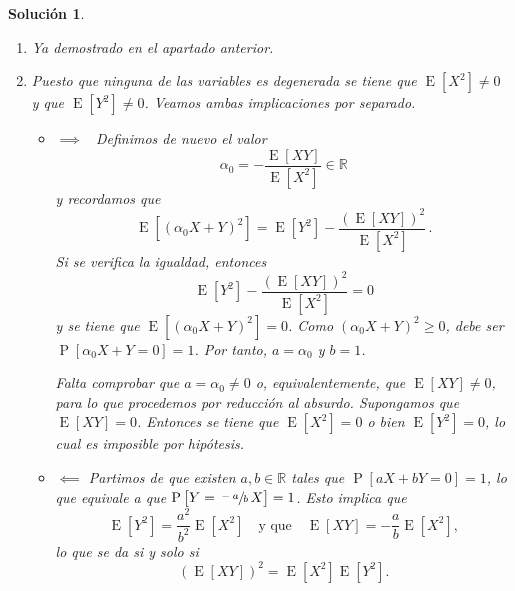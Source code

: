 \documentclass[
  a4paper,
  spanish,
  12pt,
]{scrartcl}
\theoremstyle{ejercicio-style}
\theoremstyle{remark-style}
\newtheorem*{sol}{Solución}
\begin{document}
\begin{sol}
\begin{enumerate}
  	\item Ya demostrado en el apartado anterior.
  	
  	\item Puesto que ninguna de las variables es degenerada se tiene que \(\operatorname{E}[X^2] \neq 0\) y que \(\operatorname{E}[Y^2] \neq 0\). Veamos ambas implicaciones por separado.
  	\begin{itemize}
      \item \(\boxed{\implies}\) \ Definimos de nuevo el valor \[
        \alpha_0 = -\frac{\operatorname{E}[XY]}{\operatorname{E}[X^2]} \in \mathbb{R}
      \] y recordamos que \[
        \operatorname{E}\left[(\alpha_0 X + Y)^2\right] = \operatorname{E}[Y^2] - \frac{\left(\operatorname{E}[XY]\right)^2}{\operatorname{E}[X^2]}\,.
      \] 
      Si se verifica la igualdad, entonces \[
        \operatorname{E}[Y^2] - \frac{\left(\operatorname{E}[XY]\right)^2}{\operatorname{E}[X^2]} = 0
      \] y se tiene que \(\operatorname{E}\left[(\alpha_0 X + Y)^2\right] = 0\). 
      Como \((\alpha_0 X + Y)^2 \geq 0\), debe ser \(\operatorname{P}[\alpha_0 X + Y = 0] = 1\). 
      Por tanto, \(a = \alpha_0\) y \(b=1\).

      Falta comprobar que \(a = \alpha_0 \neq 0\) o, equivalentemente, que \(\operatorname{E}[XY] \neq 0\), para lo que procedemos por reducción al absurdo. 
      Supongamos que \(\operatorname{E}[XY] = 0\). 
      Entonces se tiene que \(\operatorname{E}[X^2] = 0\) o bien \(\operatorname{E}[Y^2] = 0\), lo cual es imposible por hipótesis.

      \item \(\boxed{\impliedby}\) Partimos de que existen \(a, b \in \mathbb R\) tales que \(\operatorname{P}[aX + bY = 0] = 1\), lo que equivale a que \(\operatorname{P}\left[Y = \sfrac{-a}{b}\,X\right] = 1\). 
      Esto implica que \[
        \operatorname{E}[Y^2] = \frac{a^2}{b^2}\operatorname{E}[X^2] \quad \text{y que} \quad \operatorname{E}[XY] = -\frac{a}{b}\operatorname{E}[X^2],
      \] lo que se da si y solo si \[
        \left(\operatorname{E}[XY]\right)^2 = \operatorname{E}[X^2] \operatorname{E}[Y^2].
      \]
  	\end{itemize}
  	
  \end{enumerate}
\end{sol}
\end{document}
